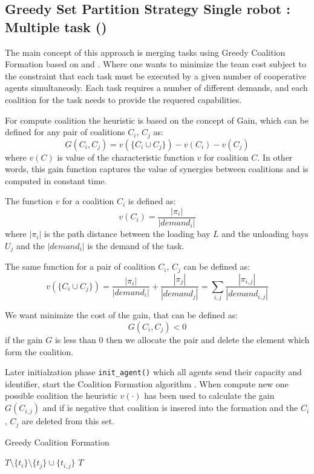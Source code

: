 \subsection{Greedy Set Partition Strategy Single robot : Multiple task (\gsp)}

The main concept of this approach is merging tasks using Greedy Coalition Formation
based on \cite{cf_greedy} and \cite{cf_farinelli}. Where one wants to minimize the 
team cost subject to the constraint that each task must be executed by a given 
number of cooperative agents simultaneosly. Each task requires a number of different 
demands, and each coalition for the task needs to provide the requered capabilities.

For compute coalition the heuristic is based on the concept of Gain, which can be 
defined for any pair of coalitions $C_i$, $C_j$ as:
\[G(C_i,C_j) = v(\{C_i \cup C_j\}) - v(C_i) - v(C_j)\]
where $v(C)$ is value of the characteristic function $v$ for coalition $C$. 
In other words, this gain function captures the value of synergies between coalitions
and is computed in constant time.

The function $v$ for a coalition $C_i$ is defined as:
\[ v(C_i) = \frac{|\pi_i|}{|demand_i|}\]
where $|\pi_i|$ is the path distance between the loading bay $L$ and the unloading bays $U_j$
and the $|demand_i|$ is the demand of the task.

The same function for a pair of coalition $C_i$, $C_j$ can be defined as:
\[  v(\{C_i \cup C_j\}) = \frac{|\pi_i|}{|demand_i|} + \frac{|\pi_j|}{|demand_j|} = \sum_{i,j} \frac{|\pi_{i,j}|}{|demand_{i,j}|} \]

We want minimize the cost of the gain, that can be defined as:
\[G(C_i,C_j) < 0 \]
if the gain $G$ is less than 0 then we allocate the pair and delete the element which
form the coalition.

Later initialzation phase \texttt{init\_agent()} which all agents send their capacity and identifier,
start the Coalition Formation algorithm \cite{cf_greedy}.
When compute new one possible coalition the heuristic  $v(\cdot)$ has been used to calculate 
the gain $G(C_{i,j})$ and if is negative that coalition is insered into the formation and the 
$C_i$ , $C_j$ are deleted from this set.

\begin{algorithm}
\caption{Greedy Coalition Formation} \label{GCF}
\begin{algorithmic}[1]
  \State {}
        $T \setminus \{ t_i\} \setminus \{t_j\} \cup \{t_{i,j}\}$
  \EndIf
  \EndIf
\EndFor
\EndFor
{} $T$
\EndProcedure
\end{algorithmic}
\end{algorithm}

